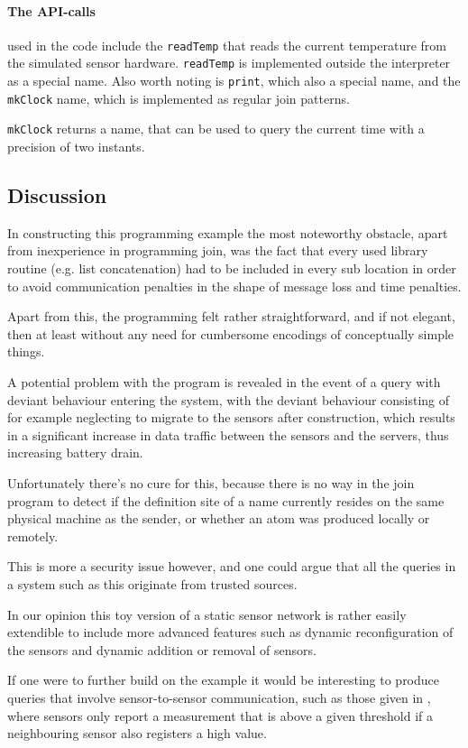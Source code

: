 \paragraph{The API-calls} used in the code include the \texttt{readTemp} that
reads the current temperature from the simulated sensor hardware.
\texttt{readTemp} is implemented outside the interpreter as a special name.
Also worth noting is \texttt{print}, which also a special name, and the
\texttt{mkClock} name, which is implemented as regular join patterns.

\texttt{mkClock} returns a name, that can be used to query the current time
with a precision of two instants.

\subsection*{Discussion}

In constructing this programming example the most noteworthy obstacle, apart
from inexperience in programming join, was the fact that every used library
routine (e.g. list concatenation) had to be included in every sub location in
order to avoid communication penalties in the shape of message loss and time
penalties.

Apart from this, the programming felt rather straightforward, and if not
elegant, then at least without any need for cumbersome encodings of conceptually
simple things.

A potential problem with the program is revealed in the event of a query with
deviant behaviour entering the system, with the deviant behaviour consisting of
for example neglecting to migrate to the sensors after construction, which results
in a significant increase in data traffic between the sensors and the servers,
thus increasing battery drain.

Unfortunately there's no cure for this, because there is no way in the join
program to detect if the definition site of a name currently resides on the same
physical machine as the sender, or whether an atom was produced locally or
remotely.

This is more a security issue however, and one could argue that all the queries
in a system such as this originate from trusted sources.

In our opinion this toy version of a static sensor network is rather easily
extendible to include more advanced features such as dynamic reconfiguration of
the sensors and dynamic addition or removal of sensors.

If one were to further build on the example it would be interesting to produce
queries that involve sensor-to-sensor communication, such as those given in
\cite{bonnet2001towards}, where sensors only report a measurement that is above
a given threshold if a neighbouring sensor also registers a high value.
